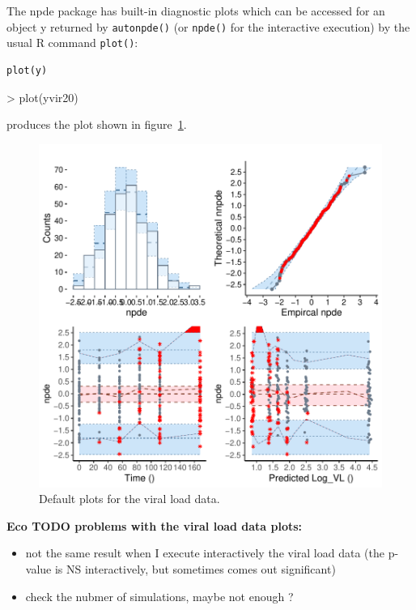 \documentclass{article}
\begin{document}
The {\sf npde} package has built-in diagnostic plots which can be accessed for an object {\sf y} returned by \verb+autonpde()+ (or \verb+npde()+ for the interactive execution) by the usual R command \verb+plot()+:
\begin{verbatim}
plot(y)
\end{verbatim}
\begin{Schunk}
\begin{Sinput}
> plot(yvir20)
\end{Sinput}
\end{Schunk}
produces the plot shown in figure~\ref{fig:defaultVL20}.  
\begin{figure}[!h]
\begin{center}
\includegraphics{demoGraphs-defplotsVir20}
\end{center}
\par \kern -0.5cm
\caption{Default plots for the viral load data.} \label{fig:defaultVL20}
\end{figure}

{\bfseries Eco TODO problems with the viral load data plots:}
\begin{itemize}
\item not the same result when I execute interactively the viral load data (the p-value is NS interactively, but sometimes comes out significant)
\item check the nubmer of simulations, maybe not enough ?
\end{itemize}
\end{document}

